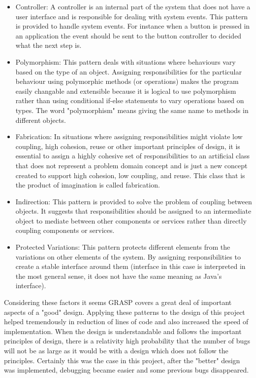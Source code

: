 \documentclass[10pt, a4paper, titlepage]{article}
\begin{document}
\begin{itemize}
\item Controller: A controller is an internal part of the system that does not have a user interface and is responsible for dealing with system events. This pattern is provided to handle system events. For instance when a button is pressed in an application the event should be sent to the button controller to decided what the next step is.
\item Polymorphism: This pattern deals with situations where behaviours vary based on the type of an object. Assigning responsibilities for the particular behaviour using polymorphic methods (or operations) makes the program easily changable and extensible because it is logical to use polymorphism rather than using conditional if-else statements to vary operations based on types. The word "polymorphism" means giving the same name to methods in different objects. 
\item Fabrication: In situations where assigning responsibilities might violate low coupling, high cohesion, reuse or other important principles of design, it is essential to assign a highly cohesive set of responsibilities to an artificial class that does not represent a problem domain concept and is just a new concept created to support high cohesion, low coupling, and reuse. This class that is the product of imagination is called fabrication. 
\item Indirection: This pattern is provided to solve the problem of coupling between objects. It suggests that responsibilities should be assigned to an intermediate object to mediate between other components or services rather than directly coupling components or services.
\item Protected Variations: This pattern protects different elements from the variations on other elements of the system. By assigning responsibilities to create a stable interface around them (interface in this case is interpreted in the most general sense, it does not have the same meaning as Java's interface).  
\end{itemize} 

Considering these factors it seems GRASP covers a great deal of important aspects of a "good" design. Applying these patterns to the design of this project helped tremendously in reduction of lines of code and also increased the speed of implementation. When the design is understandable and follows the important principles of design, there is a relativity high probability that the number of bugs will not be as large as it would be with a design which does not follow the principles. Certainly this was the case in this project, after the "better" design was implemented, debugging became easier and some previous bugs disappeared. 
\end{document}
